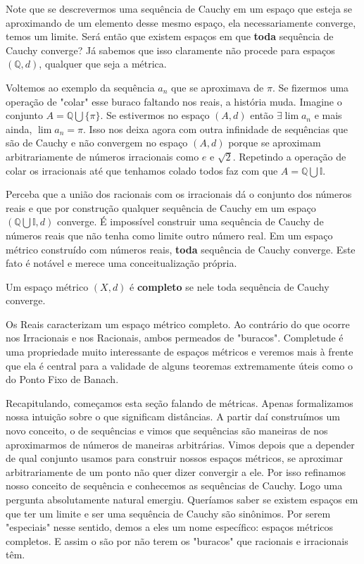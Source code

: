 Note que se descrevermos uma sequência de Cauchy em um espaço que esteja se aproximando de um elemento desse mesmo espaço, ela necessariamente converge, temos um limite. Será então que existem espaços em que \textbf{toda} sequência de Cauchy converge? Já sabemos que isso claramente não procede para espaços $(\mathbb{Q}, d)$, qualquer que seja a métrica.

Voltemos ao exemplo da sequência $a_n$ que se aproximava de $\pi$. Se fizermos uma operação de "colar" esse buraco faltando nos reais, a história muda. Imagine o conjunto $A = \mathbb{Q} \bigcup \{\pi\}$. Se estivermos no espaço $(A,d)$ então $\exists \lim a_n$ e mais ainda, $\lim a_n = \pi$. Isso nos deixa agora com outra infinidade de sequências que são de Cauchy e não convergem no espaço $(A,d)$ porque se aproximam arbitrariamente de números irracionais como $e$ e $\sqrt{2}$. Repetindo a operação de colar os irracionais até que tenhamos colado todos faz com que $A = \mathbb{Q} \bigcup \mathbb{I}$. 

Perceba que a união dos racionais com os irracionais dá o conjunto dos números reais e que por construção qualquer sequência de Cauchy em um espaço $(\mathbb{Q} \bigcup \mathbb{I}, d)$ converge. É impossível construir uma sequência de Cauchy de números reais que não tenha como limite outro número real. Em um espaço métrico construído com números reais, \textbf{toda} sequência de Cauchy converge. Este fato é notável e merece uma conceitualização própria.

\begin{defi}
Um espaço métrico $(X,d)$ é \textbf{completo} se nele toda sequência de Cauchy converge.
\end{defi}

Os Reais caracterizam um espaço métrico completo. Ao contrário do que ocorre nos Irracionais e nos Racionais, ambos permeados de "buracos". Completude é uma propriedade muito interessante de espaços métricos e veremos mais à frente que ela é central para a validade de alguns teoremas extremamente úteis como o do Ponto Fixo de Banach. 

Recapitulando, começamos esta seção falando de métricas. Apenas formalizamos nossa intuição sobre o que significam distâncias. A partir daí construímos um novo conceito, o de sequências e vimos que sequências são maneiras de nos aproximarmos de números de maneiras arbitrárias. Vimos depois que a depender de qual conjunto usamos para construir nossos espaços métricos, se aproximar arbitrariamente de um ponto não quer dizer convergir a ele. Por isso refinamos nosso conceito de sequência e conhecemos as sequências de Cauchy. Logo uma pergunta absolutamente natural emergiu. Queríamos saber se existem espaços em que ter um limite e ser uma sequência de Cauchy são sinônimos. Por serem "especiais" nesse sentido, demos a eles um nome específico: espaços métricos completos. E assim o são por não terem os "buracos" que racionais e irracionais têm.


